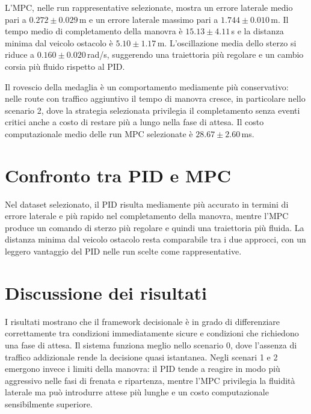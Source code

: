 L'MPC, nelle run rappresentative selezionate, mostra un errore laterale medio pari a $0.272 \pm 0.029$\,m e un errore laterale massimo pari a $1.744 \pm 0.010$\,m. Il tempo medio di completamento della manovra è $15.13 \pm 4.11$\,s e la distanza minima dal veicolo ostacolo è $5.10 \pm 1.17$\,m. L'oscillazione media dello sterzo si riduce a $0.160 \pm 0.020$\,rad/s, suggerendo una traiettoria più regolare e un cambio corsia più fluido rispetto al PID.

Il rovescio della medaglia è un comportamento mediamente più conservativo: nelle route con traffico aggiuntivo il tempo di manovra cresce, in particolare nello scenario 2, dove la strategia selezionata privilegia il completamento senza eventi critici anche a costo di restare più a lungo nella fase di attesa. Il costo computazionale medio delle run MPC selezionate è $28.67 \pm 2.60$\,ms.

\section{Confronto tra PID e MPC}





Nel dataset selezionato, il PID risulta mediamente più accurato in termini di errore laterale e più rapido nel completamento della manovra, mentre l'MPC produce un comando di sterzo più regolare e quindi una traiettoria più fluida. La distanza minima dal veicolo ostacolo resta comparabile tra i due approcci, con un leggero vantaggio del PID nelle run scelte come rappresentative.

\section{Discussione dei risultati}

I risultati mostrano che il framework decisionale è in grado di differenziare correttamente tra condizioni immediatamente sicure e condizioni che richiedono una fase di attesa. Il sistema funziona meglio nello scenario 0, dove l'assenza di traffico addizionale rende la decisione quasi istantanea. Negli scenari 1 e 2 emergono invece i limiti della manovra: il PID tende a reagire in modo più aggressivo nelle fasi di frenata e ripartenza, mentre l'MPC privilegia la fluidità laterale ma può introdurre attese più lunghe e un costo computazionale sensibilmente superiore.

